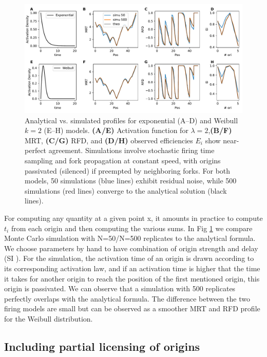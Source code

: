 \documentclass[10pt,a4paper]{revtex4-2}
\begin{document}
\begin{figure}[ht]
\includegraphics[width=1.\textwidth]{figures/theo.pdf}
\caption{
Analytical vs. simulated profiles for exponential (A--D) and Weibull \(k=2\) (E--H) models. 
\textbf{(A/E)} Activation function for $\lambda=2$,\textbf{(B/F)} MRT, \textbf{(C/G)} RFD, and \textbf{(D/H)} observed efficiencies \(E_i\) show near-perfect agreement. 
Simulations involve stochastic firing time sampling and fork propagation at constant speed, with origins passivated (silenced) 
if preempted by neighboring forks. For both models, 50 simulations (blue lines) exhibit residual noise, while 500 simulations (red lines)
 converge to the analytical solution (black lines). 
}\label{fig:valmodel}
\end{figure}

For computing any quantity at a given point x, it amounts in practice to compute $t_i$ from each origin and then computing the various sums. In Fig \ref{fig:valmodel} we compare Monte Carlo simulation with N=50/N=500 replicates to the analytical formula. We choose parameters by hand to have combination of origin strength and delay (SI ).
For the simulation, the activation time of an origin is drawn  according to its corresponding activation law, and if an activation time is higher that the time it takes for another origin to reach the position of the first mentioned origin, this origin is passivated. We can observe that a simulation with 500 replicates perfectly overlaps with the analytical formula. The difference between the two firing models are small but can be observed as a smoother MRT and RFD profile for the Weibull distribution.  


\subsection{Including partial licensing of origins}
\end{document}

